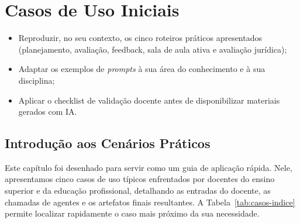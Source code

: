 \chapter{Casos de Uso Iniciais}
\label{cap:casos-de-uso}

\begin{objetivos}
\begin{itemize}
  \item Reproduzir, no seu contexto, os cinco roteiros pr{\'a}ticos apresentados (planejamento, avalia{\c c}{\~a}o, feedback, sala de aula ativa e avalia{\c c}{\~a}o jur{\'i}dica);
  \item Adaptar os exemplos de \emph{prompts} {\`a} sua {\'a}rea do conhecimento e {\`a} sua disciplina;
  \item Aplicar o checklist de valida{\c c}{\~a}o docente antes de disponibilizar materiais gerados com IA.
\end{itemize}
\end{objetivos}

\section{Introdu{\c c}{\~a}o aos Cen{\'a}rios Pr{\'a}ticos}

Este cap{\'i}tulo foi desenhado para servir como um guia de aplica{\c c}{\~a}o r{\'a}pida. Nele, apresentamos cinco casos de uso t{\'i}picos enfrentados por docentes do ensino superior e da educa{\c c}{\~a}o profissional, detalhando as entradas do docente, as chamadas de agentes e os artefatos finais resultantes. A Tabela~\ref{tab:casos-indice} permite localizar rapidamente o caso mais pr{\'o}ximo da sua necessidade.

